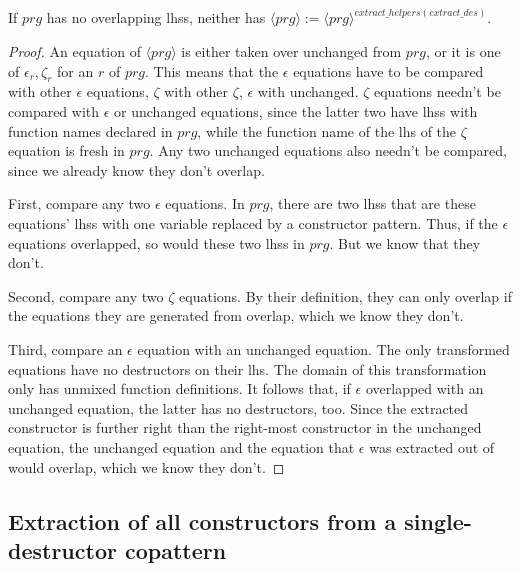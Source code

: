 \begin{lemma}

If $prg$ has no overlapping lhss, neither has $\langle prg \rangle := \langle prg \rangle^{extract\_helpers(extract\_des)}$.

\begin{proof}

An equation of $\langle prg \rangle$ is either taken over unchanged from $prg$, or it is one of $\epsilon_r, \zeta_r$ for an $r$ of $prg$. This means that the $\epsilon$ equations have to be compared with other $\epsilon$ equations, $\zeta$ with other $\zeta$, $\epsilon$ with unchanged. $\zeta$ equations needn't be compared with $\epsilon$ or unchanged equations, since the latter two have lhss with function names declared in $prg$, while the function name of the lhs of the $\zeta$ equation is fresh in $prg$. Any two unchanged equations also needn't be compared, since we already know they don't overlap.

First, compare any two $\epsilon$ equations. In $prg$, there are two lhss that are these equations' lhss with one variable replaced by a constructor pattern. Thus, if the $\epsilon$ equations overlapped, so would these two lhss in $prg$. But we know that they don't.

Second, compare any two $\zeta$ equations. By their definition, they can only overlap if the equations they are generated from overlap, which we know they don't.

Third, compare an $\epsilon$ equation with an unchanged equation. The only transformed equations have no destructors on their lhs. The domain of this transformation only has unmixed function definitions. It follows that, if $\epsilon$ overlapped with an unchanged equation, the latter has no destructors, too. Since the extracted constructor is further right than the right-most constructor in the unchanged equation, the unchanged equation and the equation that $\epsilon$ was extracted out of would overlap, which we know they don't.

\end{proof}

\end{lemma}

\subsection{Extraction of all constructors from a single-destructor copattern}

